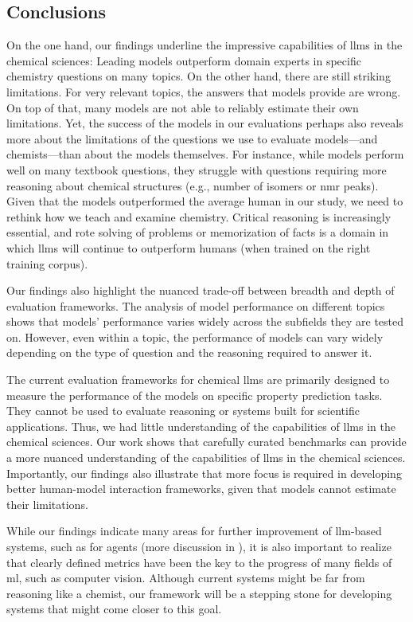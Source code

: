 \documentclass[11pt, oneside]{article}
\begin{document}
\begin{refsegment}
\section{Conclusions}
On the one hand, our findings underline the impressive capabilities of \glspl{llm} in the chemical sciences: Leading models outperform domain experts in specific chemistry questions on many topics.
On the other hand, there are still striking limitations.
For very relevant topics, the answers that models provide are wrong.
On top of that, many models are not able to reliably estimate their own limitations.
Yet, the success of the models in our evaluations perhaps also reveals more about the limitations of the questions we use to evaluate models---and chemists---than about the models themselves.
For instance, while models perform well on many textbook questions, they struggle with questions requiring more reasoning about chemical structures (e.g., number of isomers or \gls{nmr} peaks).
Given that the models outperformed the average human in our study, we need to rethink how we teach and examine chemistry.
Critical reasoning is increasingly essential, and rote solving of problems or memorization of facts is a domain in which \glspl{llm} will continue to outperform humans (when trained on the right training corpus).

Our findings also highlight the nuanced trade-off between breadth and depth of evaluation frameworks.
The analysis of model performance on different topics shows that models' performance varies widely across the subfields they are tested on.
However, even within a topic, the performance of models can vary widely depending on the type of question and the reasoning required to answer it.

The current evaluation frameworks for chemical \glspl{llm} are primarily designed to measure the performance of the models on specific property prediction tasks.
They cannot be used to evaluate reasoning or systems built for scientific applications.
Thus, we had little understanding of the capabilities of \glspl{llm} in the chemical sciences.
Our work shows that carefully curated benchmarks can provide a more nuanced understanding of the capabilities of \glspl{llm} in the chemical sciences.
Importantly, our findings also illustrate that more focus is required in developing better human-model interaction frameworks, given that models cannot estimate their limitations.

While our findings indicate many areas for further improvement of \gls{llm}-based systems, such as for agents (more discussion in ), it is also important to realize that clearly defined metrics have been the key to the progress of many fields of \gls{ml}, such as computer vision.
Although current systems might be far from reasoning like a chemist, our \chembench framework will be a stepping stone for developing systems that might come closer to this goal.


\end{refsegment}
\end{document}
